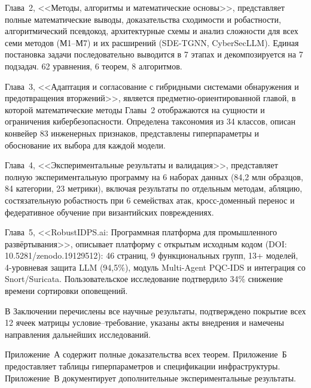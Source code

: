 Глава~2, <<Методы, алгоритмы и математические основы>>, представляет полные математические выводы, доказательства сходимости и робастности, алгоритмический псевдокод, архитектурные схемы и анализ сложности для всех семи методов (М1--М7) и их расширений (SDE-TGNN, CyberSecLLM). Единая постановка задачи последовательно выводится в 7 этапах и декомпозируется на 7 подзадач. 62 уравнения, 6 теорем, 8 алгоритмов.

Глава~3, <<Адаптация и согласование с гибридными системами обнаружения и предотвращения вторжений>>, является предметно-ориентированной главой, в которой математические методы Главы~2 отображаются на сущности и ограничения кибербезопасности. Определена таксономия из 34 классов, описан конвейер 83 инженерных признаков, представлены гиперпараметры и обоснование их выбора для каждой модели.

Глава~4, <<Экспериментальные результаты и валидация>>, представляет полную экспериментальную программу на 6 наборах данных (84,2 млн образцов, 84 категории, 23 метрики), включая результаты по отдельным методам, абляцию, состязательную робастность при 6 семействах атак, кросс-доменный перенос и федеративное обучение при византийских повреждениях.

Глава~5, <<RobustIDPS.ai: Программная платформа для промышленного развёртывания>>, описывает платформу с открытым исходным кодом (DOI: 10.5281/zenodo.19129512): 46 страниц, 9 функциональных групп, 13+ моделей, 4-уровневая защита LLM (94,5\%), модуль Multi-Agent PQC-IDS и интеграция со Snort/Suricata. Пользовательское исследование подтвердило 34\% снижение времени сортировки оповещений.

В Заключении перечислены все научные результаты, подтверждено покрытие всех 12 ячеек матрицы условие--требование, указаны акты внедрения и намечены направления дальнейших исследований.

Приложение~А содержит полные доказательства всех теорем. Приложение~Б предоставляет таблицы гиперпараметров и спецификации инфраструктуры. Приложение~В документирует дополнительные экспериментальные результаты.
